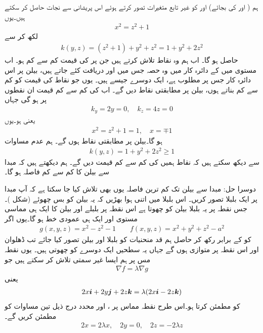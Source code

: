 ہم ( اور  کی بجائے)     اور  کو غیر تابع متغیرات تصور کرتے ہوئے اس  پریشانی سے نجات حاصل کر سکتے ہیں۔یوں
\begin{align*}
x^2=z^2+1
\end{align*}
لکھ کر  سے 
\begin{align*}
k(y,z)=(z^2+1)+y^2+z^2=1+y^2+2z^2
\end{align*}
حاصل  ہو گا۔ اب  ہم وہ نقاط تلاش کرتے ہیں جن پر  کی قیمت کم سے کم ہو۔ اب  مستوی میں  کے دائرہ کار میں وہ حصہ جس میں  اور  دریافت کئے جاتے ہیں، بیلن  پر اس دائرہ کار جس پر   مطلوب ہے،   ایک دوسرے    جیسے ہیں۔ یوں جو نقاط  کی قیمت کو کم سے کم بناتے ہوں، بیلن پر مطابقتی نقاط  دیں گے۔ اب  کی کم سے کم قیمت ان نقطوں پر ہو گی جہاں
\begin{align*}
k_y=2y=0,\quad k_z=4z=0
\end{align*}
یعنی  ہو۔یوں
\begin{align*}
x^2=z^2+1=1,\quad x=\mp 1
\end{align*}
ہو گا۔بیلن پر مطابقتی نقاط  ہوں گے۔ ہم عدم مساوات
\begin{align*}
k(y,z)=1+y^2+2z^2\ge 1
\end{align*}
سے دیکھ سکتے ہیں کہ نقاط  ہمیں  کی کم سے کم قیمت دیں گے۔ ہم  دیکھتے  ہیں کہ مبدا سے بیلن کا کم سے کم فاصلہ  ہو گا۔

دوسرا حل:\quad
مبدا سے بیلن تک کم ترین فاصلہ یوں بھی تلاش کیا جا سکتا ہے کہ آپ مبدا پر ایک بلبلا  تصور کریں۔ اس بلبلا میں اتنی ہوا بھڑیں  کہ یہ بیلن کو   بس چھوئے (شکل )۔ جس نقطہ پر یہ بلبلا بیلن کو چھوتا ہے اس نقطہ پر  بلبلے اور بیلن کا ایک ہی مماسی مستوی  اور ایک ہی عمودی خط ہو گا۔یوں اگر
\begin{align*}
g(x,y,z)=x^2-z^2-1\quad \text{}\quad f(x,y,z)=x^2+y^2+z^2-a^2
\end{align*}
کو  کے برابر رکھ کر   حاصل ہم قد منحنیات کو   بلبلا اور بیلن تصور کیا جائے  تب ڈھلوان  اور   اس نقطہ پر متوازی ہوں گے جہاں یہ سطحیں ایک دوسرے کو چھوتی  ہیں۔ یوں  نقطہ مس  پر ہم ایسا غیر سمتی   تلاش کر سکتے ہیں جو
\begin{align*}
\nabla f=\lambda \nabla g
\end{align*}
یعنی
\begin{align*}
2x{\boldsymbol{i}}+2y{\boldsymbol{j}}+2z{\boldsymbol{k}}=\lambda(2x{\boldsymbol{i}}-2z{\boldsymbol{k}})
\end{align*}
کو مطمئن کرتا ہو۔اس طرح نقطہ مماس پر ،  اور  محدد درج ذیل تین مساوات کو مطمئن کریں گے۔
\begin{align}\label{مساوات_کثیرالمتغیر_مماسی_نقطہ_شرط}
2x=2\lambda x,\quad 2y=0,\quad 2z=-2\lambda z
\end{align}

